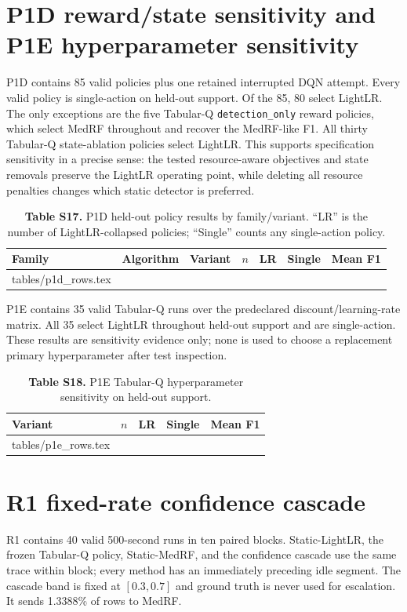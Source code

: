 \documentclass[10pt,a4paper]{article}
\makeatletter
\newcommand{\tableinput}[1]{\@@input #1.tex }
\makeatother
\begin{document}
\section{P1D reward/state sensitivity and P1E hyperparameter sensitivity}
P1D contains 85 valid policies plus one retained interrupted DQN attempt. Every valid policy is single-action on held-out support. Of the 85, 80 select LightLR. The only exceptions are the five Tabular-Q \texttt{detection\_only} reward policies, which select MedRF throughout and recover the MedRF-like F1. All thirty Tabular-Q state-ablation policies select LightLR. This supports specification sensitivity in a precise sense: the tested resource-aware objectives and state removals preserve the LightLR operating point, while deleting all resource penalties changes which static detector is preferred.

\begin{table}[h!]
\centering\footnotesize
\caption*{\textbf{Table S17.} P1D held-out policy results by family/variant. ``LR'' is the number of LightLR-collapsed policies; ``Single'' counts any single-action policy.}
\setlength{\tabcolsep}{3.2pt}
\begin{tabular}{lllrrrr}\toprule
Family & Algorithm & Variant & $n$ & LR & Single & Mean F1\\\midrule
\tableinput{tables/p1d_rows}
\bottomrule\end{tabular}
\end{table}

P1E contains 35 valid Tabular-Q runs over the predeclared discount/learning-rate matrix. All 35 select LightLR throughout held-out support and are single-action. These results are sensitivity evidence only; none is used to choose a replacement primary hyperparameter after test inspection.

\begin{table}[h!]
\centering\footnotesize
\caption*{\textbf{Table S18.} P1E Tabular-Q hyperparameter sensitivity on held-out support.}
\begin{tabular}{lrrrr}\toprule
Variant & $n$ & LR & Single & Mean F1\\\midrule
\tableinput{tables/p1e_rows}
\bottomrule\end{tabular}
\end{table}

\clearpage
\section{R1 fixed-rate confidence cascade}
R1 contains 40 valid 500-second runs in ten paired blocks. Static-LightLR, the frozen Tabular-Q policy, Static-MedRF, and the confidence cascade use the same trace within block; every method has an immediately preceding idle segment. The cascade band is fixed at $[0.3,0.7]$ and ground truth is never used for escalation. It sends 1.3388\% of rows to MedRF.
\end{document}
